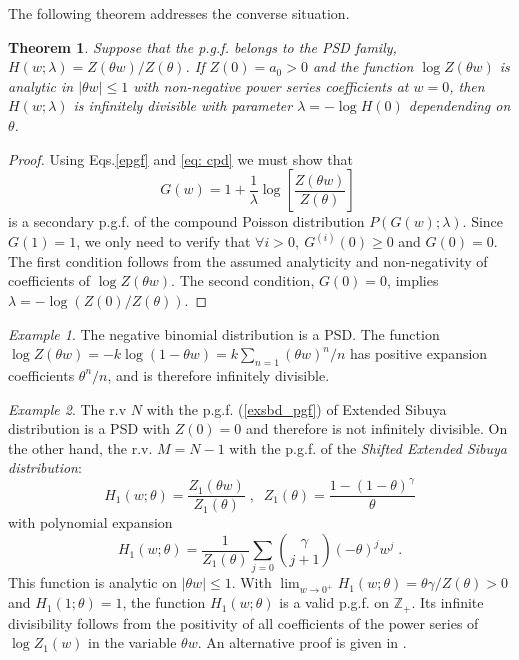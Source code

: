 \documentclass[a4paper,12pt]{amsart}
\newcommand{\Z}{\mathbb{Z}_{+}}
\newtheorem{Theorem}{Theorem}[section]
\theoremstyle{definition}
\theoremstyle{remark}
\newtheorem{Example}{Example}[section]
\begin{document}
The following theorem addresses the converse situation.
\begin{Theorem} \label{PSDisCPD}
Suppose that the p.g.f. belongs to the PSD family, $H(w;\lambda) = Z(\theta w)/Z(\theta)$. If $Z(0)=a_0>0$ and the function $\log Z(\theta w)$ is analytic in $|\theta w|\leq 1$ with non-negative power series coefficients at $w=0$, then $H(w;\lambda)$ is infinitely divisible with parameter $\lambda=-\log H(0)$ dependending on $\theta$.
\end{Theorem}
\begin{proof}
 Using Eqs.\ref{epgf} and \ref{eq: cpd} we must show that 
\begin{equation} \label{CPD_G}
 G(w) =1+\frac{1}{\lambda}\log \left[ \frac{Z(\theta w)}{Z(\theta )}\right] \;
\end{equation}
is a secondary p.g.f. of the compound Poisson distribution $P(G(w);\lambda)$. Since $G(1)=1$, we only need to verify that $\forall i>0,~ G^{(i)}(0)\geq 0$ and $G(0)=0$. The first condition follows from the assumed analyticity and non-negativity of coefficients of $\log Z(\theta w)$. The second condition, $G(0)=0$, implies  $\lambda=-\log (Z(0)/Z(\theta))$.
\end{proof}


\begin{Example}
The negative binomial distribution is a PSD. The function $\log Z(\theta w)=-k\log(1- \theta w)=k\sum_{n=1}(\theta w)^n/n$ has positive expansion coefficients $\theta^n/n$, and is therefore infinitely divisible.
\end{Example}

\begin{Example}
The r.v $N$ with the p.g.f. (\ref{exsbd_pgf}) of Extended Sibuya distribution is a PSD with $Z(0)=0$ and therefore is not infinitely divisible.  On the other hand, the r.v. $M=N-1$  with the p.g.f. of the {\it Shifted Extended Sibuya distribution}:
\begin{equation} \label{shexsbd}
H_1(w;\theta)=\frac{Z_1(\theta w)}{Z_1(\theta)}\;,\;\; 
 Z_1(\theta)=\frac{1-(1-\theta)^{\gamma}}{\theta}
\end{equation}
with polynomial expansion 
\begin{equation}
H_1(w;\theta)=
\frac{1}{Z_1(\theta)}\sum_{j=0} \binom{\gamma }{j+1}(-\theta )^j w^j\;.
\end{equation}
This function is analytic on $|\theta w| \leq 1$.  With $\lim_{w\to 0^+}H_1(w;\theta)=\theta\gamma/Z(\theta)>0$ and $H_1(1;\theta)=1$, the function $H_1(w;\theta)$ is a valid p.g.f. on $\Z$. Its infinite divisibility follows from the positivity of all coefficients of the power series of $\log Z_1(w)$ in the variable $\theta w$. An alternative proof is given in \cite{Klebanov2023-xj}. 
\end{Example}
\end{document}
